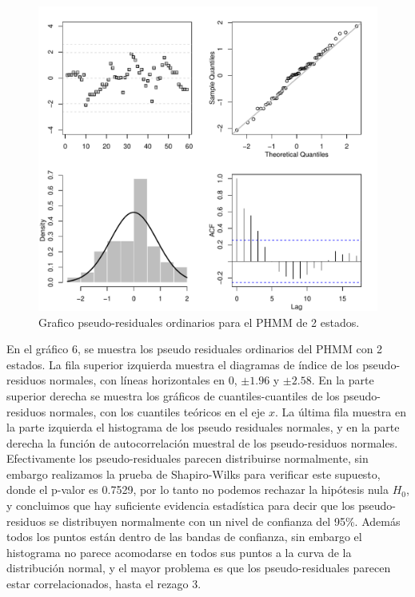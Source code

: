 \documentclass[a4paper]{article}\usepackage[]{graphicx}\usepackage[]{color}
\makeatletter
\def\maxwidth{ %
  \ifdim\Gin@nat@width>\linewidth
    \linewidth
  \else
    \Gin@nat@width
  \fi
}
\newenvironment{knitrout}{}{} %
\makeatother
\begin{document}
\begin{knitrout}
\color{fgcolor}\begin{figure}[h]
\includegraphics[width=\maxwidth]{figure/unnamed-chunk-16-1} \caption[Grafico pseudo-residuales ordinarios para el PHMM de 2 estados]{Grafico pseudo-residuales ordinarios para el PHMM de 2 estados.}\label{fig:unnamed-chunk-16}
\end{figure}


\end{knitrout}

En el gráfico 6, se muestra los pseudo residuales ordinarios del PHMM con 2 estados. La fila superior izquierda muestra el diagramas de índice de los pseudo-residuos normales, con líneas horizontales en 0, $\pm 1.96$ y $\pm 2.58$. En la parte superior derecha se muestra los gráficos de cuantiles-cuantiles de los pseudo-residuos normales, con los cuantiles teóricos en el eje $x$. La última fila muestra en la parte izquierda el histograma de los pseudo residuales normales, y en la parte derecha la función de autocorrelación muestral de los pseudo-residuos normales. Efectivamente los pseudo-residuales parecen distribuirse normalmente, sin embargo realizamos la prueba de Shapiro-Wilks para verificar este supuesto, donde el p-valor es 0.7529, por lo tanto no podemos rechazar la hipótesis nula $H_0$, y concluimos que hay suficiente evidencia estadística para decir que los pseudo-residuos se distribuyen normalmente con un nivel de confianza del 95\%. Además todos los puntos están dentro de las bandas de confianza, sin embargo el histograma no parece acomodarse en todos sus puntos a la curva de la distribución normal, y el mayor problema es que los pseudo-residuales parecen estar correlacionados, hasta el rezago 3.
\end{document}
